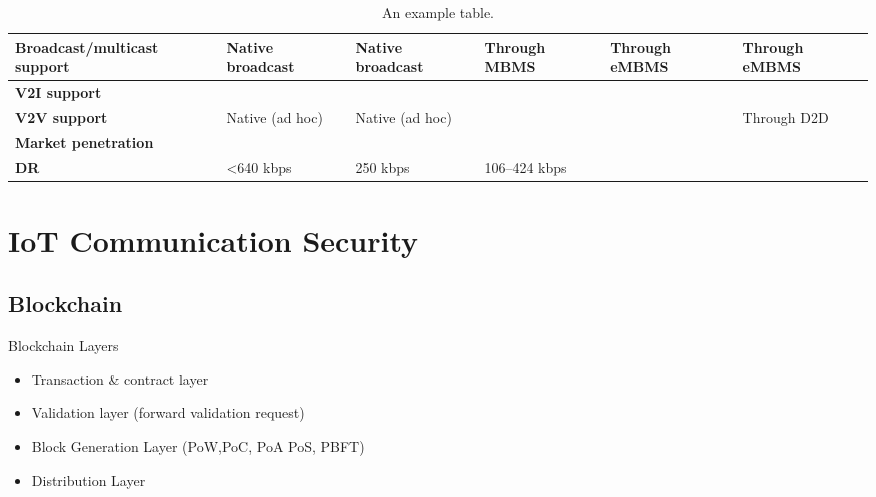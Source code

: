 \begin{table}[h!]
\begin{tabulary}{\textwidth}{L|L|L|L|L|L}
	\bf{Broadcast/multicast support} & Native broadcast                                      & Native broadcast                                      & Through MBMS                     & Through eMBMS            & Through eMBMS             \\\hline
	\bf{V2I support}                 & \ok                                                   & \ok                                                   & \ok                              & \ok                      & \ok                       \\\hline
	\bf{V2V support}                 & Native (ad hoc)                                       & Native (ad hoc)                                       & \ko                              & \ko                      & Through D2D               \\\hline
	\bf{Market penetration}          & \ok                                                   & \ko                                                   & \ok                              & \ok                      & \ok                       \\\hline
	\bf{\ac{DR}}                   & <640 kbps                                        & 250 kbps                                              & 106–424 kbps                              & \ok                      & \ok                       \\\hline
	\end{tabulary}
	\caption{\label{tab:Tableppp} An example table.}
\end{table}





\section{IoT Communication Security}

\subsection{Blockchain}

Blockchain Layers
\begin{itemize}
	\item Transaction \& contract layer
	\item Validation layer (forward validation request)
	\item Block Generation Layer (PoW,PoC, PoA PoS, PBFT)
	\item Distribution Layer
	\\
\end{itemize}


